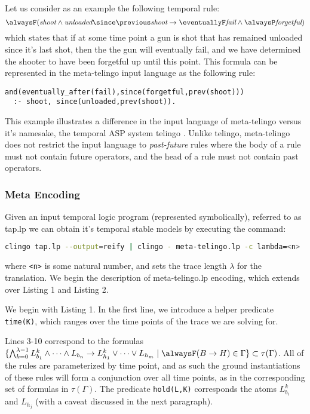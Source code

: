 Let us consider as an example the following temporal rule:
\begin{equation*}
\alwaysF(\textit{shoot} \wedge \textit{unloaded} \since \previous \textit{shoot} 
\rightarrow \eventuallyF \textit{fail} \wedge \alwaysP \textit{forgetful})
\end{equation*}
which states that if at some time point a gun is shot that has
remained unloaded since it's last shot, then the the gun will
eventually fail, and we have determined the shooter to have been
forgetful up until this point. This formula can be represented in the
meta-telingo input language as the following rule:
\begin{center}
    \begin{lstlisting}[numbers=none]
and(eventually_after(fail),since(forgetful,prev(shoot))) 
  :- shoot, since(unloaded,prev(shoot)).
    \end{lstlisting}
\end{center}

This example illustrates a difference in the input language of
meta-telingo versus it's namesake, the temporal ASP system
telingo\cite{cakamosc19a} \cite{agcadipescscvi20a}. Unlike telingo,
meta-telingo does not restrict the input language to
\emph{past-future} rules \cite{agcadipescscvi20a} where the body of a
rule must not contain future operators, and the head of a rule must
not contain past operators.

\subsubsection{Meta Encoding}

Given an input temporal logic program (represented symbolically),
referred to as tap.lp we can obtain it's temporal stable models by
executing the command:

\begin{lstlisting}[language=bash,numbers=none]
clingo tap.lp --output=reify | clingo - meta-telingo.lp -c lambda=<n>
\end{lstlisting}

where \verb|<n>| is some natural number, and sets the trace length
$\lambda$ for the translation. We begin the description of
meta-telingo.lp encoding, which extends over Listing 1 and Listing 2.

We begin with Listing 1. In the first line, we introduce a helper
predicate \verb|time(K)|, which ranges over the time points of the trace we
are solving for. 

Lines 3-10 correspond to the formulas
$\{ \bigwedge_{k=0}^{\lambda-1} L_{b_1}^k \land \dots \land L_{b_n}
\rightarrow L_{h_1}^k \lor \dots \lor L_{h_m} \mid \tempruleshort \in
\Gamma \} \subset \tau(\Gamma)$. All of the rules are parameterized by
time point, and as such the ground instantiations of these rules will
form a conjunction over all time points, as in the corresponding set
of formulas in $\tau(\Gamma)$. The predicate \verb|hold(L,K)|
corresponds the atoms $L_{b_i}^k$ and $L_{h_j}$ (with a caveat
discussed in the next paragraph).

